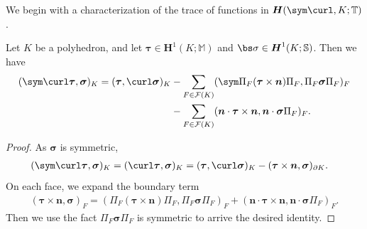 We begin with a characterization of the trace of functions in $\boldsymbol H(\sym \curl,K; \mathbb T)$.
\begin{lemma} \label{lm:Green}
Let $K$ be a polyhedron, and let $\boldsymbol  \tau\in \boldsymbol H^1(K; \mathbb M)$ and $\bs\sigma \in \boldsymbol H^1(K; \mathbb S)$. Then we have
\begin{align}
(\sym\curl\boldsymbol \tau, \boldsymbol \sigma)_K=(\boldsymbol \tau, \curl\boldsymbol \sigma)_K & - \sum_{F\in\mathcal F(K)}(\sym \Pi_F (\boldsymbol \tau\times\boldsymbol n)\Pi_F, \Pi_F \boldsymbol\sigma \Pi_F)_F \notag\\
& - \sum_{F\in\mathcal F(K)}(\boldsymbol n\cdot \boldsymbol \tau\times\boldsymbol n, \boldsymbol  n\cdot \boldsymbol\sigma \Pi_F)_F. \notag%
\end{align}
\end{lemma}
\begin{proof}
As $\boldsymbol \sigma$ is symmetric,
\begin{align*}
(\sym\curl\boldsymbol \tau, \boldsymbol \sigma)_K&= (\curl\boldsymbol \tau, \boldsymbol \sigma)_K = (\boldsymbol \tau, \curl \boldsymbol \sigma)_K - (\boldsymbol \tau \times \boldsymbol n, \boldsymbol \sigma)_{\partial K}.
\end{align*}
On each face, we expand the boundary term
\begin{align*}
(\boldsymbol \tau\times \boldsymbol n, \boldsymbol \sigma)_{F} = (\Pi_F (\boldsymbol \tau\times \boldsymbol n)\Pi_F, \Pi_F \boldsymbol\sigma \Pi_F)_F + (\boldsymbol n\cdot \boldsymbol \tau\times\boldsymbol n , \boldsymbol  n\cdot \boldsymbol\sigma \Pi_F)_F.
\end{align*}
Then we use the fact $\Pi_F \boldsymbol\sigma \Pi_F$ is symmetric to arrive the desired identity. 
\end{proof}

